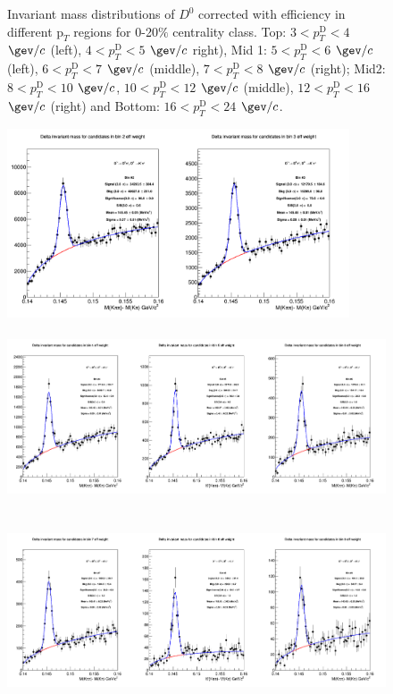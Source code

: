 \begin{figure}[!htp]
\caption{Invariant mass distributions of $D^0$ corrected with efficiency in different $\text{p}_T$ regions for 0-20$\%$ centrality class. Top: $3< p_{T}^{\text{D}}< 4$ $\gev/c$ (left), $4< p_{T}^{\text{D}}< 5$ $\gev/c$ right), Mid 1: $5< p_{T}^{\text{D}}< 6$ $\gev/c$ (left), $6 < p_{T}^{\text{D}} < 7$ $\gev/c$ (middle), $7< p_{T}^{\text{D}}< 8$ $\gev/c$ (right); Mid2: $8< p_{T}^{\text{D}}< 10$ $\gev/c$, $10< p_{T}^{\text{D}}< 12$ $\gev/c$  (middle), $12 < p_{T}^{\text{D}}< 16$ $\gev/c$  (right) and Bottom: $16<p_{T}^{\text{D}}< 24$ $\gev/c$.}
\label{fig:InvMassD0020}
\end{figure}


\begin{figure}[!htp]
\centering
{\includegraphics[width=1\linewidth, height=5.6cm]{figuresVsCent/Dstar/MassPlots/020/InvMassDistributions_Dstar_Bins2to3.png}}
{\includegraphics[width=1\linewidth, height=5.6cm]{figuresVsCent/Dstar/MassPlots/020/InvMassDistributions_Dstar_Bins4to6.png}}
{\includegraphics[width=1\linewidth, height=5.6cm]{figuresVsCent/Dstar/MassPlots/020/InvMassDistributions_Dstar_Bins7to9.png}}

\end{figure}
